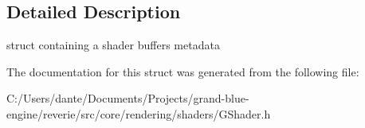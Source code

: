 \subsection{Detailed Description}
struct containing a shader buffer\textquotesingle{}s metadata 

The documentation for this struct was generated from the following file\+:\begin{DoxyCompactItemize}
\item 
C\+:/\+Users/dante/\+Documents/\+Projects/grand-\/blue-\/engine/reverie/src/core/rendering/shaders/G\+Shader.\+h\end{DoxyCompactItemize}
